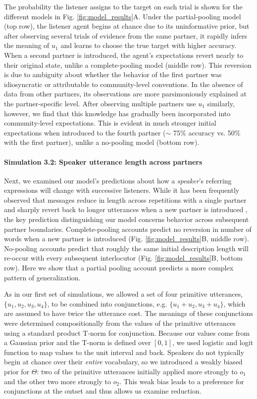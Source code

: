 The probability the listener assigns to the target on each trial is shown for the different models in Fig. \ref{fig:model_results}A.
Under the partial-pooling model (top row), the listener agent begins at chance due to its uninformative prior, but after observing several trials of evidence from the same partner, it rapidly infers the meaning of $u_1$ and learns to choose the true target with higher accuracy.
When a second partner is introduced, the agent's expectations revert nearly to their original state, unlike a complete-pooling model (middle row).
This reversion is due to ambiguity about whether the behavior of the first partner was idiosyncratic or attributable to community-level conventions.
In the absence of data from other partners, its observations are more parsimoniously explained at the partner-specific level.
After observing multiple partners use $u_1$ similarly, however, we find that this knowledge has gradually been incorporated into community-level expectations. 
This is evident in much stronger initial expectations when introduced to the fourth partner ($\sim$ 75\% accuracy vs. 50\% with the first partner), unlike a no-pooling model (bottom row).

\paragraph{Simulation 3.2: Speaker utterance length across partners}

Next, we examined our model's predictions about how a \emph{speaker}'s referring expressions will change with successive listeners.
While it has been frequently observed that messages reduce in length across repetitions with a single partner \cite{krauss_changes_1964} and sharply revert back to longer utterances when a new partner is introduced \cite{wilkes-gibbs_coordinating_1992}, the key prediction distinguishing our model concerns behavior across subsequent partner boundaries.
Complete-pooling accounts predict no reversion in number of words when a new partner is introduced  (Fig. \ref{fig:model_results}B, middle row).
No-pooling accounts predict that roughly the same initial description length will re-occur with every subsequent interlocutor  (Fig. \ref{fig:model_results}B, bottom row). 
Here we show that a partial pooling account predicts a more complex pattern of generalization.

As in our first set of simulations, we allowed a set of four primitive utterances, $\{u_1, u_2, u_3, u_4\}$, to be combined into conjunctions, e.g. $\{u_1+u_2, u_3+u_4\}$, which are assumed to have twice the utterance cost.
The meanings of these conjunctions were determined compositionally from the values of the primitive utterances using a standard product T-norm for conjunction. 
Because our values come from a Gaussian prior and the T-norm is defined over $[0,1]$, we used logistic and logit function to map values to the unit interval and back.
Speakers do not typically begin at chance over their \emph{entire} vocabulary, so we introduced a weakly biased prior for $\Theta$: two of the primitive utterances initially applied more strongly to $o_1$ and the other two more strongly to $o_2$.
This weak bias leads to a preference for conjunctions at the outset and thus allows us examine reduction.

